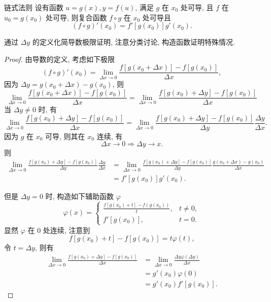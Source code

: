 \documentclass[cn,toc=twocol]{elegantbook}
\begin{document}
\begin{theorem}{链式法则}
	设有函数 $u = g(x), y = f(u)$, 满足 $g$ 在 $x_0$ 处可导, 且 $f$ 在 $u_0 = g(x_0)$ 处可导, 则复合函数 $f \circ g$ 在 $x_0$ 处可导且
	\[
		(f \circ g)'(x_0) = f'[g(x_0)] g'(x_0).
	\]
\end{theorem}
\begin{idea*}
	通过 $\Delta y$ 的定义化简导数极限证明, 注意分类讨论, 构造函数证明特殊情况.
\end{idea*}
\begin{proof}
	由导数的定义, 考虑如下极限
	\[
		(f \circ g)'(x_0) = \lim_{\Delta x \to 0} \frac{f[g(x_0 + \Delta x)] - f[g(x_0)]}{\Delta x},
	\]
	因为 $\Delta y = g(x_0 + \Delta x) - g(x_0)$, 则
	\[
		\lim_{\Delta x \to 0} \frac{f[g(x_0 + \Delta x)] - f[g(x_0)]}{\Delta x} = \lim_{\Delta x \to 0} \frac{f[g(x_0) + \Delta y] - f[g(x_0)]}{\Delta x}
	\]
	当 $\Delta y \neq 0$ 时, 有
	\[
		\lim_{\Delta x \to 0} \frac{f[g(x_0) + \Delta y] - f[g(x_0)]}{\Delta x} = \lim_{\Delta x \to 0} \frac{f[g(x_0) + \Delta y] - f[g(x_0)]}{\Delta y} \frac{\Delta y}{\Delta x}.
	\]
	因为 $g$ 在 $x_0$ 可导, 则其在 $x_0$ 连续, 有
	\[
		\Delta x \to 0 \Longrightarrow \Delta y \to x.
	\]
	则
	\[
	\begin{aligned}
		\lim_{\Delta x \to 0} \frac{f[g(x_0) + \Delta y] - f[g(x_0)]}{\Delta y} \frac{\Delta y}{\Delta x} &= \lim_{\Delta x \to 0} \frac{f[g(x_0) + \Delta y] - f[g(x_0)]}{\Delta y} \frac{g(x_0 + \Delta x) -g(x_0)}{\Delta x}\\
		&= f'[g(x_0)] g'(x_0).
	\end{aligned}
	\]
	
	但是 $\Delta y = 0$ 时, 构造如下辅助函数 $\varphi$
	\[
		\varphi(x) = \begin{cases}
			\frac{f[g(x_0) + t] - f(g(x_0))}{t}, & t \neq 0,\\
			f'[g(x_0)], & t = 0.
		\end{cases}
	\]
	显然 $\varphi$ 在 $0$ 处连续, 注意到
	\[
		f[g(x_0) + t] - f[g(x_0)] = t \varphi(t),
	\]
	令 $t = \Delta y$, 则有
	\[
	\begin{aligned}
		\lim_{\Delta x \to 0} \frac{f[g(x_0) + \Delta y] - f[g(x_0)]}{\Delta x} &= \lim_{\Delta x \to 0} \frac{\Delta y \varphi(\Delta y)}{\Delta x}\\
		&= g'(x_0) \varphi(0)\\
		&= g'(x_0) f'[g(x_0)].
	\end{aligned}
	\]
\end{proof}

\vspace{0.5em}
\end{document}
